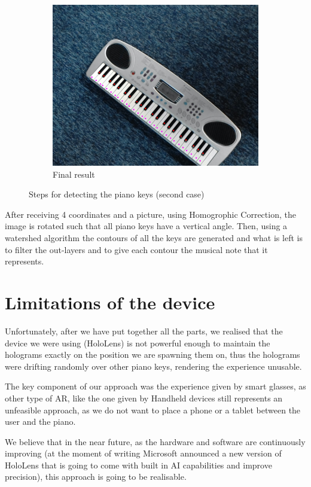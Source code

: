 \documentclass[12 pct]{report}
\begin{document}
\begin{figure}[H]
\begin{subfigure}[b]{0.7\linewidth}
    \includegraphics[width=\linewidth]{piano-pointsv2}
    \caption{Final result}
  \end{subfigure}
  \caption{Steps for detecting the piano keys (second case)}
  \label{fig:coffee3}
\end{figure}

After receiving 4 coordinates and a picture, using Homogrophic Correction, the image is rotated such that all piano keys have a vertical angle. Then, using a watershed algorithm the contours of all the keys are generated and what is left is to filter the out-layers and to give each contour the musical note that it represents. 

\section{Limitations of the device}

Unfortunately, after we have put together all the parts, we realised that the device we were using (HoloLens) is not powerful enough to maintain the holograms exactly on the position we are spawning them on, thus the holograms were drifting randomly over other piano keys, rendering the experience unusable.

The key component of our approach was the experience given by smart glasses, as other type of AR, like the one given by Handheld devices still represents an unfeasible approach, as we do not want to place a phone or a tablet between the user and the piano.

We believe that in the near future, as the hardware and software are continuously improving (at the moment of writing Microsoft announced a new version of HoloLens that is going to come with built in AI capabilities and improve precision), this approach is going to be realisable.
\end{document}
